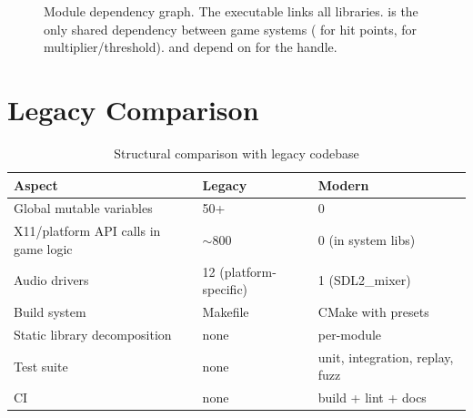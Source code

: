 \documentclass[11pt,a4paper]{article}
\begin{document}
\begin{figure}[h]
\caption{Module dependency graph. The executable links all libraries.  is the only shared dependency between game systems ( for hit points,  for multiplier/threshold).  and  depend on  for the  handle.}
\label{fig:dep-map}
\end{figure}


\section{Legacy Comparison}
\label{sec:legacy-compare}

\begin{table}[h]
\centering
\caption{Structural comparison with legacy codebase}
\label{tab:legacy-compare}
\begin{tabularx}{\textwidth}{Xll}
\toprule
\textbf{Aspect} & \textbf{Legacy} & \textbf{Modern} \\
\midrule
Global mutable variables & 50+ & 0 \\
X11/platform API calls in game logic & $\sim$800 & 0 (in system libs) \\
Audio drivers & 12 (platform-specific) & 1 (SDL2\_mixer) \\
Build system & Makefile & CMake with presets \\
Static library decomposition & none & per-module \\
Test suite & none & unit, integration, replay, fuzz \\
CI & none & build + lint + docs \\
\bottomrule
\end{tabularx}
\end{table}
\end{document}
